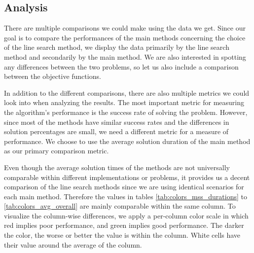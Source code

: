 \documentclass[english, 12pt, a4paper, sci, utf8, a-1b, online, table]{aaltothesis}
\begin{document}
\subsection{Analysis}

There are multiple comparisons we could make using the data we get. Since our goal is to compare the performances of the main methods concerning the choice of the line search method, we display the data primarily by the line search method and secondarily by the main method. We are also interested in spotting any differences between the two problems, so let us also include a comparison between the objective functions.

In addition to the different comparisons, there are also multiple metrics we could look into when analyzing the results. The most important metric for measuring the algorithm's performance is the success rate of solving the problem. However, since most of the methods have similar success rates and the differences in solution percentages are small, we need a different metric for a measure of performance. We choose to use the average solution duration of the main method as our primary comparison metric.

Even though the average solution times of the methods are not universally comparable within different implementations or problems, it provides us a decent comparison of the line search methods since we are using identical scenarios for each main method. Therefore the values in tables \ref{tab:colors_mss_durations} to \ref{tab:colors_avg_overall} are mainly comparable within the same column. To visualize the column-wise differences, we apply a per-column color scale in which red implies poor performance, and green implies good performance. The darker the color, the worse or better the value is within the column. White cells have their value around the average of the column.
\end{document}
